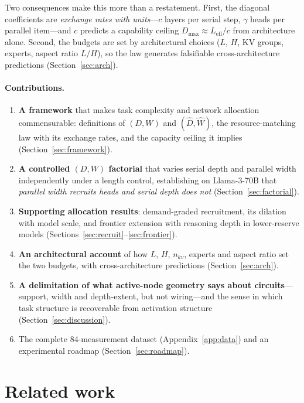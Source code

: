 \documentclass[11pt]{article}
\newcommand{\Dh}{\hat{D}}
\newcommand{\Wh}{\hat{W}}
\begin{document}
Two consequences make this more than a restatement. First, the diagonal
coefficients are \emph{exchange rates with units}---$c$ layers per serial
step, $\gamma$ heads per parallel item---and $c$ predicts a capability ceiling
$D_{\max}\approx L_{\text{eff}}/c$ from architecture alone. Second, the
budgets are set by architectural choices ($L$, $H$, KV groups, experts, aspect
ratio $L/H$), so the law generates falsifiable cross-architecture predictions
(Section~\ref{sec:arch}).

\paragraph{Contributions.}
\begin{enumerate}[leftmargin=1.4em,itemsep=2pt]
\item \textbf{A framework} that makes task complexity and network allocation
commensurable: definitions of $(D,W)$ and $(\Dh,\Wh)$, the resource-matching
law with its exchange rates, and the capacity ceiling it implies
(Section~\ref{sec:framework}).
\item \textbf{A controlled $(D,W)$ factorial} that varies serial depth and
parallel width independently under a length control, establishing on
Llama-3-70B that \emph{parallel width recruits heads and serial depth does
not} (Section~\ref{sec:factorial}).
\item \textbf{Supporting allocation results}: demand-graded recruitment, its
dilation with model scale, and frontier extension with reasoning depth in
lower-reserve models (Sections~\ref{sec:recruit}--\ref{sec:frontier}).
\item \textbf{An architectural account} of how $L$, $H$, $n_{kv}$, experts and
aspect ratio set the two budgets, with cross-architecture predictions
(Section~\ref{sec:arch}).
\item \textbf{A delimitation of what active-node geometry says about
circuits}---support, width and depth-extent, but not wiring---and the sense in
which task structure is recoverable from activation structure
(Section~\ref{sec:discussion}).
\item The complete 84-measurement dataset (Appendix~\ref{app:data}) and an
experimental roadmap (Section~\ref{sec:roadmap}).
\end{enumerate}

\section{Related work}
\end{document}
